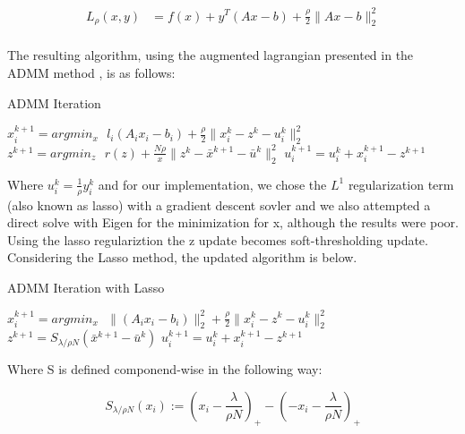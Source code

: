 \documentclass[letterpaper,11pt,onecolumn]{article}
\begin{document}
\begin{center}
  \begin{align}
		L_{\rho}(x,y) &= f(x) + y^{T}(Ax-b) + \frac{\rho}{2}\|Ax - b\|_{2}^{2} \\
  \end{align}
\end{center}


\noindent The resulting algorithm, using the augmented lagrangian presented in the ADMM method \cite{ADMM}, is as follows:

\begin{center}
\begin{algorithm}
\caption{ADMM Iteration}
\begin{algorithmic}[1]
	\STATE $x_{i}^{k+1} = argmin_{x} \: \: \: l_{i}(A_{i}x_{i} - b_{i}) + \frac{\rho}{2} \| x_{i}^{k} - z^{k} - u_{i}^{k} \|_{2}^{2}$ 
	\STATE $z^{k+1} = argmin_{z} \: \: \: r(z) + \frac{N \rho}{x} \| z^{k} - \bar{x}^{k+1} - \bar{u}^{k} \|_{2}^{2} $
	\STATE $u_{i}^{k+1} = u_{i}^{k} + x_{i}^{k+1} - z^{k+1} $ 
  \end{algorithmic}
\end{algorithm}
\end{center}

Where $u_{i}^{k} = \frac{1}{\rho} y_{i}^{k}$ and for our implementation, we chose the $L^{1}$ regularization term (also known as lasso) with a gradient descent sovler and we also attempted a direct solve with Eigen for the minimization for x, although the results were poor. Using the lasso regulariztion the z update becomes soft-thresholding update. Considering the Lasso method, the updated algorithm is below.

\begin{center}
\begin{algorithm}
\caption{ADMM Iteration with Lasso}
\begin{algorithmic}[1]
  \STATE $x_{i}^{k+1} = argmin_{x} \: \: \: \|(A_{i}x_{i} - b_{i})\|_{2}^{2} + \frac{\rho}{2} \| x_{i}^{k} - z^{k} - u_{i}^{k} \|_{2}^{2}$ 
  \STATE $z^{k+1} = S_{\lambda/\rho N} (\bar{x}^{k+1} - \bar{u}^{k})$
	\STATE $u_{i}^{k+1} = u_{i}^{k} + x_{i}^{k+1} - z^{k+1} $ 
  \end{algorithmic}
\end{algorithm}
\end{center}

\noindent Where S is defined componend-wise in the following way:

\begin{center}
	\begin{equation}
	  S_{\lambda/\rho N}(x_{i}) := (x_{i} - \frac{\lambda}{\rho N})_{+} - (-x_{i} - \frac{\lambda}{\rho N})_{+}
	\end{equation}
\end{center}
\end{document}
